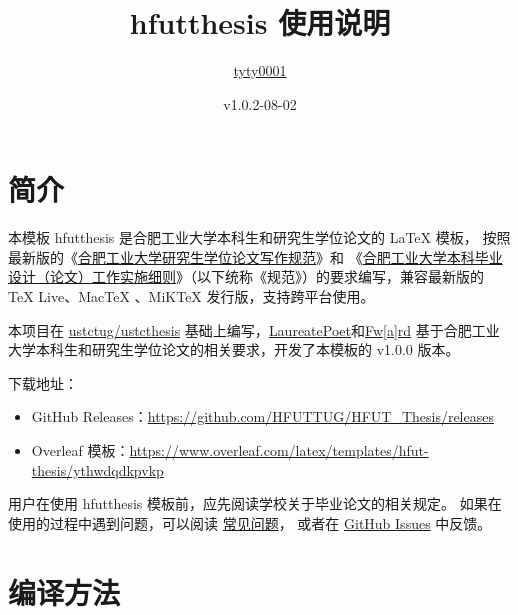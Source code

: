\documentclass[a4paper]{ltxdoc}
\DeclareRobustCommand\pkg{\textsf}
\DeclareRobustCommand\cls{\textsf}
\begin{document}
\title{\cls{hfutthesis} 使用说明}
\author{
  \href{https://github.com/tyty0001}{tyty0001}
 }
\date{v1.0.2-08-02}
\maketitle



\section{简介}

本模板 \cls{hfutthesis} 是合肥工业大学本科生和研究生学位论文的 \LaTeX{}
模板， 按照最新版的《\href{http://xwgl.hfut.edu.cn/2021/0419/c1975a253949/page.htm}
{合肥工业大学研究生学位论文写作规范}》和
《\href{http://xcjwb.hfut.edu.cn/53/cc/c1144a21452/page.htm}
{合肥工业大学本科毕业设计（论文）工作实施细则}》（以下统称《规范》）的要求编写，兼容最新版的 TeX Live、MacTeX 、MiKTeX 发行版，支持跨平台使用。

本项目在 \href{https://github.com/ustctug/ustcthesis}
{ustctug/ustcthesis} 基础上编写，\href{https://github.com/LaureatePoet}{LaureatePoet}和\href{https://github.com/HowardZorn}{Fw[a]rd} 基于合肥工业大学本科生和研究生学位论文的相关要求，开发了本模板的 v1.0.0 版本。

下载地址：
\begin{itemize}
  \item GitHub Releases：\url{https://github.com/HFUTTUG/HFUT_Thesis/releases}
  \item Overleaf 模板：\url{https://www.overleaf.com/latex/templates/hfut-thesis/ythwdqdkpvkp}
\end{itemize}

用户在使用 \pkg{hfutthesis} 模板前，应先阅读学校关于毕业论文的相关规定。
如果在使用的过程中遇到问题，可以阅读
\href{https://github.com/HFUTTUG/HFUT_Thesis/wiki}{常见问题}，
或者在 \href{https://github.com/HFUTTUG/HFUT_Thesis/issues}{GitHub Issues}
中反馈。

\section{编译方法}
\end{document}
